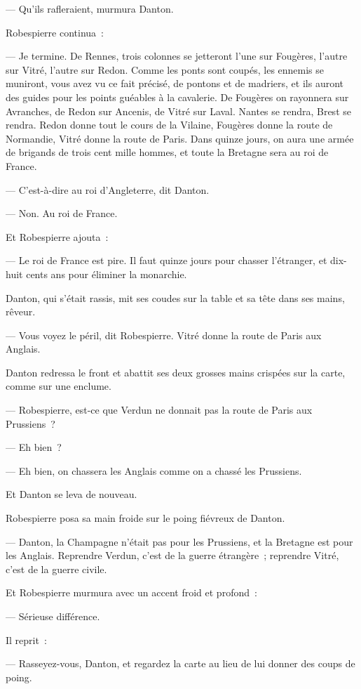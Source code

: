 \documentclass[french,twoside]{book} %
\begin{document}
— Qu’ils rafleraient, murmura Danton.\par
Robespierre continua :\par
— Je termine. De Rennes, trois colonnes se jetteront l’une sur Fougères, l’autre sur Vitré, l’autre sur Redon. Comme les ponts sont coupés, les ennemis se muniront, vous avez vu ce fait précisé, de pontons et de madriers, et ils auront des guides pour les points guéables à la cavalerie. De Fougères on rayonnera sur Avranches, de Redon sur Ancenis, de Vitré sur Laval. Nantes se rendra, Brest se rendra. Redon donne tout le cours de la Vilaine, Fougères donne la route de Normandie, Vitré donne la route de Paris. Dans quinze jours, on aura une armée de brigands de trois cent mille hommes, et toute la Bretagne sera au roi de France.\par
— C’est-à-dire au roi d’Angleterre, dit Danton.\par
— Non. Au roi de France.\par
Et Robespierre ajouta :\par
— Le roi de France est pire. Il faut quinze jours pour chasser l’étranger, et dix-huit cents ans pour éliminer la monarchie.\par
 Danton, qui s’était rassis, mit ses coudes sur la table et sa tête dans ses mains, rêveur.\par
— Vous voyez le péril, dit Robespierre. Vitré donne la route de Paris aux Anglais.\par
Danton redressa le front et abattit ses deux grosses mains crispées sur la carte, comme sur une enclume.\par
— Robespierre, est-ce que Verdun ne donnait pas la route de Paris aux Prussiens ?\par
— Eh bien ?\par
— Eh bien, on chassera les Anglais comme on a chassé les Prussiens.\par
Et Danton se leva de nouveau.\par
Robespierre posa sa main froide sur le poing fiévreux de Danton.\par
— Danton, la Champagne n’était pas pour les Prussiens, et la Bretagne est pour les Anglais. Reprendre Verdun, c’est de la guerre étrangère ; reprendre Vitré, c’est de la guerre civile.\par
Et Robespierre murmura avec un accent froid et profond :\par
— Sérieuse différence.\par
Il reprit :\par
— Rasseyez-vous, Danton, et regardez la carte au lieu de lui donner des coups de poing.\par
\end{document}
